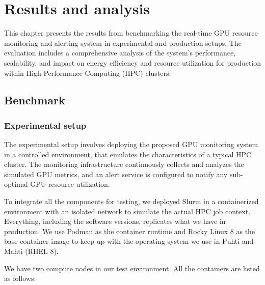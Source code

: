 \chapter{Results and analysis}
\label{chap:result}
This chapter presents the results from benchmarking the real-time GPU resource monitoring and alerting system in experimental and production setups. The evaluation includes a comprehensive analysis of the system's performance, scalability, and impact on energy efficiency and resource utilization for production within High-Performance Computing (HPC) clusters.

\section{Benchmark}
\subsection{Experimental setup}
\label{subsection:experiment}
The experimental setup involves deploying the proposed GPU monitoring system in a controlled environment, that emulates the characteristics of a typical HPC cluster. The monitoring infrastructure continuously collects and analyzes the simulated GPU metrics, and an alert service is configured to notify any sub-optimal GPU resource utilization.

To integrate all the components for testing, we deployed Slurm in a containerized environment with an isolated network to simulate the actual HPC job context. Everything, including the software versions, replicates what we have in production. We use Podman as the container runtime and Rocky Linux 8 as the base container image to keep up with the operating system we use in Puhti and Mahti (RHEL 8).

We have two compute nodes in our test environment. All the containers are listed as follows:
 
